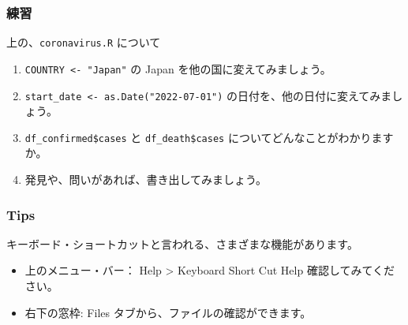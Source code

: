 \documentclass[
]{bxjsbook}
\newenvironment{Shaded}{\begin{snugshade}}{\end{snugshade}}
\newcommand{\AttributeTok}[1]{\textcolor[rgb]{0.77,0.63,0.00}{#1}}
\newcommand{\DocumentationTok}[1]{\textcolor[rgb]{0.56,0.35,0.01}{\textbf{\textit{#1}}}}
\newcommand{\FunctionTok}[1]{\textcolor[rgb]{0.00,0.00,0.00}{#1}}
\newcommand{\NormalTok}[1]{#1}
\newcommand{\SpecialCharTok}[1]{\textcolor[rgb]{0.00,0.00,0.00}{#1}}
\newcommand{\StringTok}[1]{\textcolor[rgb]{0.31,0.60,0.02}{#1}}
\providecommand{\tightlist}{%
  \setlength{\itemsep}{0pt}\setlength{\parskip}{0pt}}
\theoremstyle{definition}
\theoremstyle{definition}
\theoremstyle{definition}
\theoremstyle{definition}
\theoremstyle{remark}
\begin{document}
\begin{Shaded}
\end{Shaded}

\hypertarget{ux7df4ux7fd2-1}{%
\subsubsection{練習}\label{ux7df4ux7fd2-1}}

上の、\texttt{coronavirus.R} について

\begin{enumerate}
\def\labelenumi{\arabic{enumi}.}
\tightlist
\item
  \texttt{COUNTRY\ \textless{}-\ "Japan"} の Japan を他の国に変えてみましょう。
\item
  \texttt{start\_date\ \textless{}-\ as.Date("2022-07-01")} の日付を、他の日付に変えてみましょう。
\item
  \texttt{df\_confirmed\$cases} と \texttt{df\_death\$cases} についてどんなことがわかりますか。
\item
  発見や、問いがあれば、書き出してみましょう。
\end{enumerate}

\hypertarget{tips}{%
\subsubsection{Tips}\label{tips}}

キーボード・ショートカットと言われる、さまざまな機能があります。

\begin{itemize}
\tightlist
\item
  上のメニュー・バー： Help \textgreater{} Keyboard Short Cut Help 確認してみてください。
\item
  右下の窓枠: Files タブから、ファイルの確認ができます。
\end{itemize}
\end{document}
